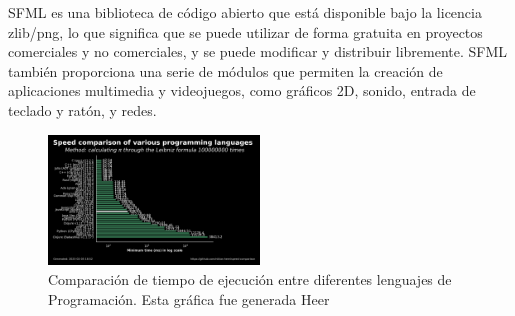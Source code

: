     SFML es una biblioteca de c\'odigo abierto que est\'a disponible bajo la licencia zlib/png, lo que significa que 
        se puede utilizar de forma gratuita en proyectos comerciales y no comerciales, y se puede modificar y distribuir 
        libremente. SFML tambi\'en proporciona una serie de m\'odulos que permiten la creaci\'on de aplicaciones multimedia 
        y videojuegos, como gr\'aficos 2D, sonido, entrada de teclado y rat\'on, y redes.
    \vskip 0.5cm
    \begin{figure}[h]  
        \centering
        \includegraphics[width=0.5\textwidth]{./images/marco_teorico/Grafico/ComparacionLenguajes.png}
        \caption{Comparaci\'on de tiempo de ejecuci\'on entre diferentes lenguajes de Programaci\'on. Esta gr\'afica fue generada Heer \cite{ComparitionLanguajes}}
        \label{fig:tiempoEjecucion}
    \end{figure}
    \clearpage